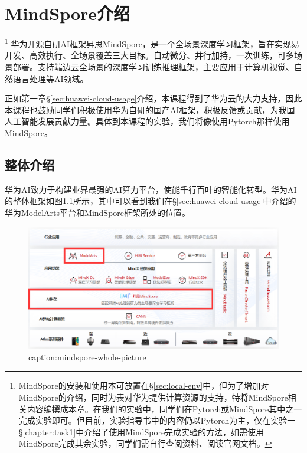 \chapter{MindSpore介绍}

\footnote{MindSpore的安装和使用本可放置在\S\ref{sec:local-env}中，但为了增加对MindSpore的介绍，同时为表对华为提供计算资源的支持，特将MindSpore相关内容编撰成本章。在我们的实验中，同学们在Pytorch或MindSpore其中之一完成实验即可。但目前，实验指导书中的内容仍以Pytorch为主，仅在实验一\S\ref{chapter:task1}中介绍了使用MindSpore完成实验的方法，如需使用MindSpore完成其余实验，同学们需自行查阅资料、阅读官网文档。}
华为开源自研AI框架{昇}思MindSpore，是一个全场景深度学习框架，旨在实现易开发、高效执行、全场景覆盖三大目标。自动微分、并行加持，一次训练，可多场景部署。支持端边云全场景的深度学习训练推理框架，主要应用于计算机视觉、自然语言处理等AI领域。

正如第一章\S\ref{sec:huawei-cloud-usage}介绍，本课程得到了华为云的大力支持，因此本课程也鼓励同学们积极使用华为自研的国产AI框架，积极反馈或贡献，为我国人工智能发展贡献力量。具体到本课程的实验，我们将像使用Pytorch那样使用MindSpore。



\section{整体介绍}

华为AI致力于构建业界最强的AI算力平台，使能千行百叶的智能化转型。华为AI的整体框架如图\ref{fig:mindspore-whole-picture}所示，其中可以看到我们在\S\ref{sec:huawei-cloud-usage}中介绍的华为ModelArts平台和MindSpore框架所处的位置。
\begin{figure}[htbp]
	\centering
	\includegraphics[width=1\textwidth]{figures/mindspore-whole-picture.png}
	\caption{caption:mindspore-whole-picture}
	\label{fig:mindspore-whole-picture}
\end{figure}

